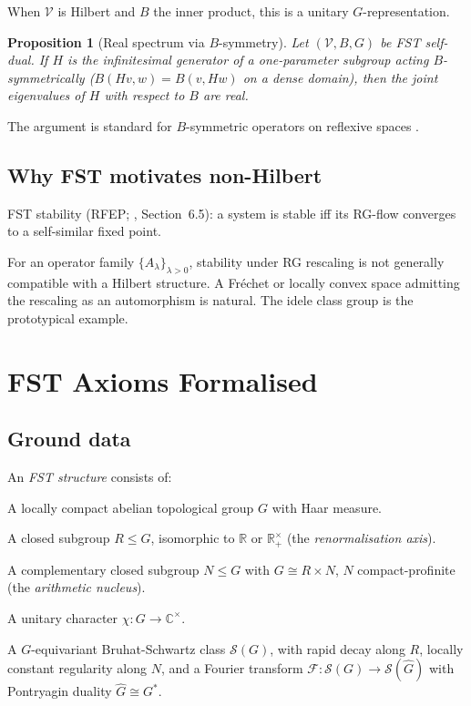 \documentclass[11pt,a4paper]{article}
\theoremstyle{plain}
\newtheorem{proposition}[theorem]{Proposition}
\theoremstyle{definition}
\newcommand{\C}{\mathbb{C}}
\newcommand{\R}{\mathbb{R}}
\newcommand{\V}{\mathcal{V}}
\renewcommand{\S}{\mathcal{S}}
\newcommand{\chifn}{\chi}
\begin{document}
When $\V$ is Hilbert and $B$ the inner product, this is a unitary
$G$-representation.

\begin{proposition}[Real spectrum via $B$-symmetry]
\label{prop:real-spectrum}
Let $(\V, B, G)$ be FST self-dual.  If $H$ is the infinitesimal
generator of a one-parameter subgroup acting $B$-symmetrically
($B(Hv, w) = B(v, Hw)$ on a dense domain), then the joint eigenvalues
of $H$ with respect to $B$ are real.
\end{proposition}

The argument is standard for $B$-symmetric operators on reflexive
spaces \cite{Meyer2005}.

\subsection{Why FST motivates non-Hilbert}

FST stability (RFEP; \cite{MathMaster}, Section~6.5): a system is stable iff its RG-flow
converges to a self-similar fixed point.

For an operator family $\{A_\lambda\}_{\lambda > 0}$, stability
under RG rescaling is not generally compatible with a Hilbert
structure.  A Fr\'echet or locally convex space admitting the
rescaling as an automorphism is natural.  The idele class group is
the prototypical example.

\section{FST Axioms Formalised}
\label{sec:axioms}

\subsection{Ground data}

An \emph{FST structure} consists of:

\begin{description}[style=nextline]
\item[(G)] A locally compact abelian topological group $G$ with
  Haar measure.
\item[(R)] A closed subgroup $R \leq G$, isomorphic to $\R$ or
  $\R_+^\times$ (the \emph{renormalisation axis}).
\item[(N)] A complementary closed subgroup $N \leq G$ with $G
  \cong R \times N$, $N$ compact-profinite (the \emph{arithmetic
  nucleus}).
\item[($\chifn$)] A unitary character $\chifn : G \to \C^\times$.
\item[(S)] A $G$-equivariant Bruhat-Schwartz class $\S(G)$, with
  rapid decay along $R$, locally constant regularity along $N$,
  and a Fourier transform $\mathcal F : \S(G) \to \S(\hat G)$
  with Pontryagin duality $\hat G \cong G^\ast$.
\end{description}
\end{document}

